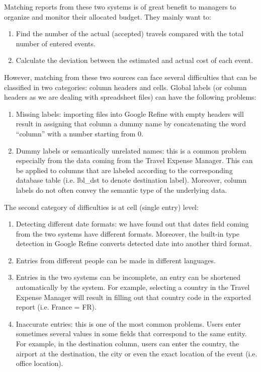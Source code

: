 \documentclass{sig-alternate}
\begin{document}
Matching reports from these two systems is of great benefit to managers to organize and monitor their allocated budget. They mainly want to:

\begin{enumerate}
\item  Find the number of the actual (accepted) travels compared with the total number of entered events.

\item  Calculate the deviation between the estimated and actual cost of each event.
\end{enumerate}

However, matching from these two sources can face several difficulties that can be classified in two categories: column headers and cells. Global labels (or column headers as we are dealing with spreadsheet files) can have the following problems:

\begin{enumerate}
\item  Missing labels: importing files into Google Refine with empty headers will result in assigning that column a dummy name by concatenating the word ``column'' with a number starting from 0.

\item  Dummy labels or semantically unrelated names: this is a common problem especially from the data coming from the Travel Expense Manager. This can be applied to columns that are labeled according to the corresponding database table (i.e. lbl\_dst to denote destination label). Moreover, column labels do not often convey the semantic type of the underlying data.
\end{enumerate}

The second category of difficulties is at cell (single entry) level:

\begin{enumerate}
\item  Detecting different date formats: we have found out that dates field coming from the two systems have different formats. Moreover, the built-in type detection in Google Refine converts detected date into another third format.

\item  Entries from different people can be made in different languages.

\item  Entries in the two systems can be incomplete, an entry can be shortened automatically by the system. For example, selecting a country in the Travel Expense Manager will result in filling out that country code in the exported report (i.e. France = FR).

\item  Inaccurate entries: this is one of the most common problems. Users enter sometimes several values in some fields that correspond to the same entity. For example, in the destination column, users can enter the country, the airport at the destination, the city or even the exact location of the event (i.e. office location).
\end{enumerate}
\end{document}
